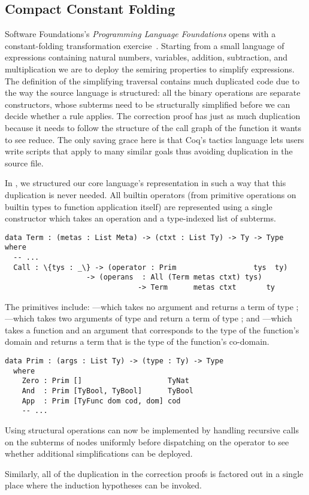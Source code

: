 \subsection{Compact Constant Folding}
\label{sec:design:constants}

Software Foundations's \emph{Programming Language Foundations} opens with a constant-folding transformation exercise~\cite[Chapter~1]{Pierce:SF2}.
%
Starting from a small language of expressions containing natural numbers, variables, addition, subtraction, and multiplication we are to deploy the semiring properties to simplify expressions.
%
The definition of the simplifying traversal contains much duplicated code due to the way the source language is structured:
%
all the binary operations are separate constructors, whose subterms need to be structurally simplified before we can decide whether a rule applies.
%
The correction proof has just as much duplication because it needs to follow the structure of the call graph of the function it wants to see reduce.
%
The only saving grace here is that Coq's tactics language lets users write scripts that apply to many similar goals thus avoiding duplication in the source file.

In \Velo{}, we structured our core language's representation in such a way that this duplication is never needed.
%
All builtin operators (from primitive operations on builtin types to function application itself) are represented using a single  constructor which takes an operation and a type-indexed list of subterms.

\begin{Verbatim}
data Term : (metas : List Meta) -> (ctxt : List Ty) -> Ty -> Type where
  -- ...
  Call : \{tys : _\} -> (operator : Prim                  tys  ty)
                   -> (operans  : All (Term metas ctxt) tys)
                               -> Term      metas ctxt       ty
\end{Verbatim}

The primitives include:
%
---which takes no argument and returns a term of type ;
%
---which takes two arguments of type  and return a term
of type ;
%
and
%
---which takes a function and an argument that corresponds to the type of the function's domain and returns a term that is the type of the function's co-domain.

\begin{Verbatim}
data Prim : (args : List Ty) -> (type : Ty) -> Type
  where
    Zero : Prim []                    TyNat
    And  : Prim [TyBool, TyBool]      TyBool
    App  : Prim [TyFunc dom cod, dom] cod
    -- ...
\end{Verbatim}

Using  structural operations can now be implemented by handling recursive calls on the subterms of  nodes uniformly before dispatching on the operator to see whether additional simplifications can be deployed.

Similarly, all of the duplication in the correction proofs is factored out in a single place where the induction hypotheses can be invoked.

